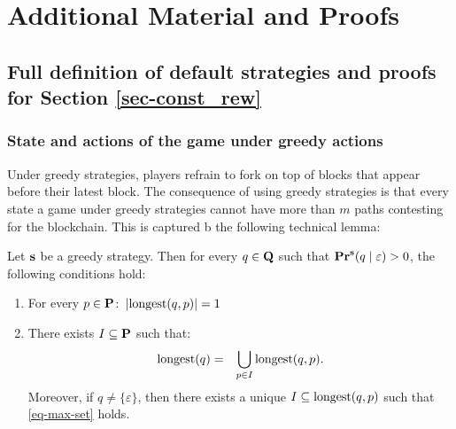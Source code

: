 
\section{Additional Material and Proofs}
\label{sec-appendix}

\subsection{Full definition of default strategies and proofs for Section \ref{sec-const_rew}}  

\subsubsection*{State and actions of the game under greedy actions}

Under greedy strategies, players refrain to fork on top of blocks that appear before their latest block.
The consequence of using 
greedy strategies is that every state a game under greedy strategies cannot have more than $m$ paths contesting for the blockchain. This is captured b the following 
technical lemma: 
\begin{mylem}\label{lem-length-greedy}
Let $\mathbf{s}$ be a greedy strategy. Then for every $q \in \mathbf{Q}$ such that $\mathbf{Pr}^{\mathbf{s}}(q \mid \varepsilon) > 0$, the following conditions hold:
\begin{enumerate}
\item For every $p \in \mathbf{P}$$:$ $|{\text{\rm longest}}(q,p)| = 1$ 

\item There exists $I \subseteq \mathbf{P}$ such that$:$
\begin{eqnarray}\label{eq-max-set}
{\text{\rm longest}}(q) & = & \bigcup_{p \in I} {\text{\rm longest}}(q,p).
\end{eqnarray}
Moreover, if $q \neq \{\varepsilon\}$, then there exists a unique $I \subseteq {\text{\rm longest}}(q,p)$ such that \eqref{eq-max-set} holds.
\end{enumerate}
\end{mylem}

